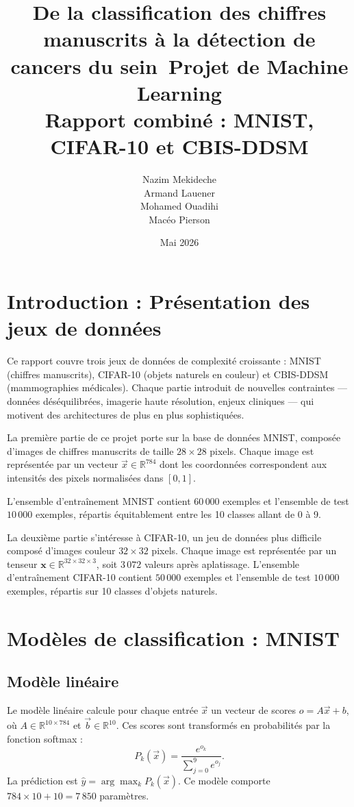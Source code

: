 \documentclass[a4paper,10pt]{article}
\title{\textbf{De la classification des chiffres manuscrits
à la détection de cancers du sein}\
\large Projet de Machine Learning \\
Rapport combiné : MNIST, CIFAR-10 et CBIS-DDSM}
\author{Nazim Mekideche \\ Armand Lauener \\ Mohamed Ouadihi \\ Macéo Pierson}
\date{Mai 2026}
\begin{document}
\maketitle

\section{Introduction : Présentation des jeux de données}

Ce rapport couvre trois jeux de données de complexité croissante : MNIST (chiffres manuscrits), CIFAR-10 (objets naturels en couleur) et CBIS-DDSM (mammographies médicales).
Chaque partie introduit de nouvelles contraintes — données déséquilibrées, imagerie haute résolution, enjeux cliniques — qui motivent des architectures de plus en plus sophistiquées.

La première partie de ce projet porte sur la base de données MNIST, composée d'images de chiffres manuscrits de taille $28 \times 28$ pixels.
Chaque image est représentée par un vecteur $\vec{x} \in \mathbb{R}^{784}$ dont les coordonnées correspondent aux intensités des pixels normalisées dans $[0,1]$.

L'ensemble d'entraînement MNIST contient $60\,000$ exemples et l'ensemble de test $10\,000$ exemples, répartis équitablement entre les 10 classes allant de 0 à 9.

La deuxième partie s'intéresse à CIFAR-10, un jeu de données plus difficile composé d'images couleur $32 \times 32$ pixels.
Chaque image est représentée par un tenseur $\mathbf{x} \in \mathbb{R}^{32 \times 32 \times 3}$, soit $3\,072$ valeurs après aplatissage.
L'ensemble d'entraînement CIFAR-10 contient $50\,000$ exemples et l'ensemble de test $10\,000$ exemples, répartis sur 10 classes d'objets naturels.

\section{Modèles de classification : MNIST}

\subsection{Modèle linéaire}

Le modèle linéaire calcule pour chaque entrée $\vec{x}$ un vecteur de scores
$o = A \vec{x} + b$, où $A \in \mathbb{R}^{10 \times 784}$ et $\vec{b} \in \mathbb{R}^{10}$.
Ces scores sont transformés en probabilités par la fonction softmax :
\[
P_k(\vec{x}) = \frac{e^{o_k}}{\sum_{j=0}^{9} e^{o_j}}.
\]
La prédiction est $\hat{y} = \arg\max_k P_k(\vec{x})$.
Ce modèle comporte $784 \times 10 + 10 = 7\,850$ paramètres.
\end{document}
